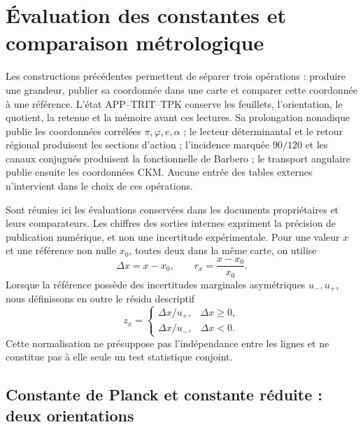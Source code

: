 \section{Évaluation des constantes et comparaison métrologique}
\label{ii:sec:ii-contraste-cuantitativo}

Les constructions précédentes permettent de séparer trois opérations :
produire une grandeur, publier sa coordonnée dans une carte et comparer cette
coordonnée à une référence. L’état APP--TRIT--TPK conserve les feuillets,
l’orientation, le quotient, la retenue et la mémoire avant ces lectures. Sa
prolongation nonadique publie les coordonnées corrélées
\(\pi,\varphi,e,\alpha\) ; le lecteur déterminantal et le retour régional
produisent les sections d’action ; l’incidence marquée \(90/120\) et
les canaux conjugués produisent la fonctionnelle de Barbero ; le transport
angulaire publie ensuite les coordonnées CKM. Aucune entrée des tables
externes n’intervient dans le choix de ces opérations.

Sont réunies ici les évaluations conservées dans les documents propriétaires et leurs
comparateurs. Les chiffres des sorties internes expriment la précision de
publication numérique, et non une incertitude expérimentale. Pour une valeur
\(x\) et une référence non nulle \(x_0\), toutes deux dans la même carte, on utilise
\[
 \Delta x=x-x_0,\qquad r_x=\frac{x-x_0}{x_0}.
\]
Lorsque la référence possède des incertitudes marginales asymétriques
\(u_-,u_+\), nous définissons en outre le résidu descriptif
\begin{equation}
 z_x=\begin{cases}
 \Delta x/u_+,&\Delta x\geq0,\\
 \Delta x/u_-,&\Delta x<0.
 \end{cases}
 \label{ii:eq:ii-residuo-marginal}
\end{equation}
Cette normalisation ne présuppose pas l’indépendance entre les lignes et ne constitue pas
à elle seule un test statistique conjoint.

\subsection{Constante de Planck et constante réduite : deux orientations}

